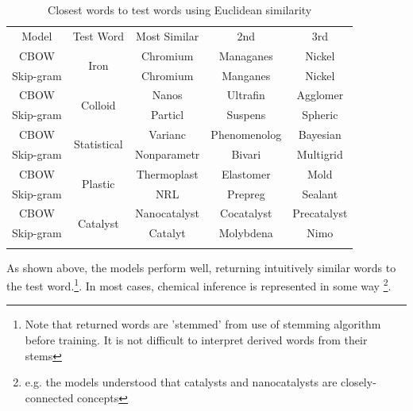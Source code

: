 \begin{table}[h!]
\begin{center}
\caption[Word similarity examinations with euclidean similarity]{Closest words to test words using Euclidean similarity}
\label{tab:EUCLIDSIMS}
\begin{tabular}{||c||c|c|c|c||}
\hline
Model     & Test Word              & Most Similar & 2nd & 3rd \\ \hhline{||=||=|=|=|=||}
CBOW      & \multirow{2}{*}{Iron} & Chromium             &  Managanes   &   Nickel  \\ \cline{1-1} \cline{3-5} 
Skip-gram &                   &  Chromium            &   Manganes  &  Nickel   \\ 
\hhline{||=||=|=|=|=||}
CBOW      & \multirow{2}{*}{Colloid} & Nanos             &  Ultrafin   &   Agglomer  \\ \cline{1-1} \cline{3-5} 
Skip-gram &                   &  Particl            &   Suspens  &  Spheric   \\ 
\hhline{||=||=|=|=|=||}
CBOW      & \multirow{2}{*}{Statistical} & Varianc             &  Phenomenolog   &   Bayesian  \\ \cline{1-1} \cline{3-5} 
Skip-gram &                   &  Nonparametr            &   Bivari  &  Multigrid   \\ 
\hhline{||=||=|=|=|=||}
CBOW      & \multirow{2}{*}{Plastic} & Thermoplast             &  Elastomer   & Mold    \\ \cline{1-1} \cline{3-5} 
Skip-gram &                   &  NRL            &   Prepreg  &  Sealant   \\ 
\hhline{||=||=|=|=|=||}
CBOW      & \multirow{2}{*}{Catalyst} & Nanocatalyst             &  Cocatalyst   & Precatalyst    \\ \cline{1-1} \cline{3-5} 
Skip-gram &                   &  Catalyt            &   Molybdena  &  Nimo   \\ 
\hhline{||=||=|=|=|=||}
\end{tabular}
\end{center}
\end{table}
As shown above, the models perform well, returning intuitively similar words to the test word.\footnote{Note that returned words are 'stemmed' from use of stemming algorithm before training. It is not difficult to interpret derived words from their stems}. In most cases, chemical inference is represented in some way \footnote{e.g. the models understood that catalysts and nanocatalysts are closely-connected concepts}.

